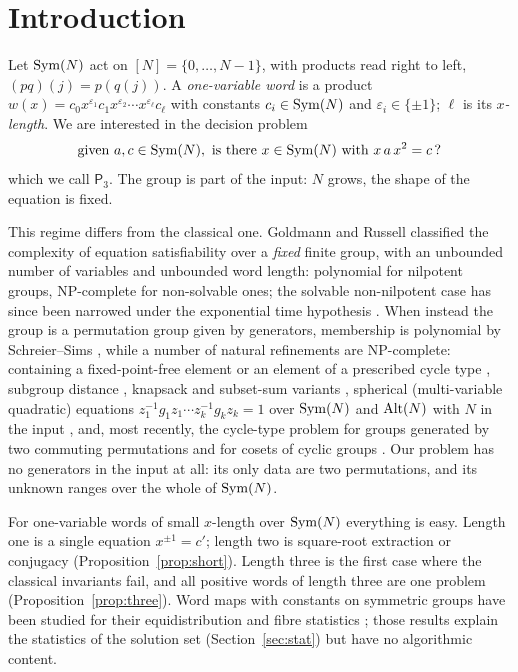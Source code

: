 \documentclass[preprint,12pt]{elsarticle}
\theoremstyle{definition}\newtheorem{defi}[thm]{Definition}\newtheorem{prob}[thm]{Problem}\newtheorem{obs}[thm]{Observation}
\theoremstyle{remark}\newtheorem{rem}[thm]{Remark}
\newcommand{\Pthree}{\mathsf{P}_3}\newcommand{\Conj}[1]{\mathsf{Conj}_{#1}}\newcommand{\Dzero}{\Conj{3}}\newcommand{\TR}{T_{\mathcal R}}
\begin{document}
\section{Introduction}

Let $\operatorname{Sym}(N)$ act on $[N]=\{0,\ldots,N-1\}$, with products read right to left, $(pq)(j)=p(q(j))$. A \emph{one-variable word} is a product $w(x)=c_0x^{\varepsilon_1}c_1x^{\varepsilon_2}\cdots x^{\varepsilon_\ell}c_\ell$ with constants $c_i\in\operatorname{Sym}(N)$ and $\varepsilon_i\in\{\pm1\}$; $\ell$ is its \emph{$x$-length}. We are interested in the decision problem
\[
 \text{given } a,c\in\operatorname{Sym}(N),\ \text{is there } x\in\operatorname{Sym}(N)\text{ with } x\,a\,x^{2}=c\,?
\]
which we call $\Pthree$. The group is part of the input: $N$ grows, the shape of the equation is fixed.

This regime differs from the classical one. Goldmann and Russell \cite{goldmann2002} classified the complexity of equation satisfiability over a \emph{fixed} finite group, with an unbounded number of variables and unbounded word length: polynomial for nilpotent groups, NP-complete for non-solvable ones; the solvable non-nilpotent case has since been narrowed under the exponential time hypothesis \cite{horvath2011,idziak2022,weiss2020}. When instead the group is a permutation group given by generators, membership is polynomial by Schreier--Sims \cite{sims1970,seress2003,luks1993}, while a number of natural refinements are NP-complete: containing a fixed-point-free element or an element of a prescribed cycle type \cite{lubiw1981,cameronwu2010,arvind2013}, subgroup distance \cite{buchheim2009}, knapsack and subset-sum variants \cite{lohrey2022mfcs,lohrey2025membership}, spherical (multi-variable quadratic) equations $z_1^{-1}g_1z_1\cdots z_k^{-1}g_kz_k=1$ over $\operatorname{Sym}(N)$ and $\operatorname{Alt}(N)$ with $N$ in the input \cite{mattes2024spherical}, and, most recently, the cycle-type problem for groups generated by two commuting permutations and for cosets of cyclic groups \cite{lohreyrosowski2025}. Our problem has no generators in the input at all: its only data are two permutations, and its unknown ranges over the whole of $\operatorname{Sym}(N)$.

For one-variable words of small $x$-length over $\operatorname{Sym}(N)$ everything is easy. Length one is a single equation $x^{\pm1}=c'$; length two is square-root extraction or conjugacy (Proposition~\ref{prop:short}). Length three is the first case where the classical invariants fail, and all positive words of length three are one problem (Proposition~\ref{prop:three}). Word maps with constants on symmetric groups have been studied for their equidistribution and fibre statistics \cite{larsen2012,shalev2009,garion2009,schneider2023,alekseev2025}; those results explain the statistics of the solution set (Section~\ref{sec:stat}) but have no algorithmic content.
\end{document}
